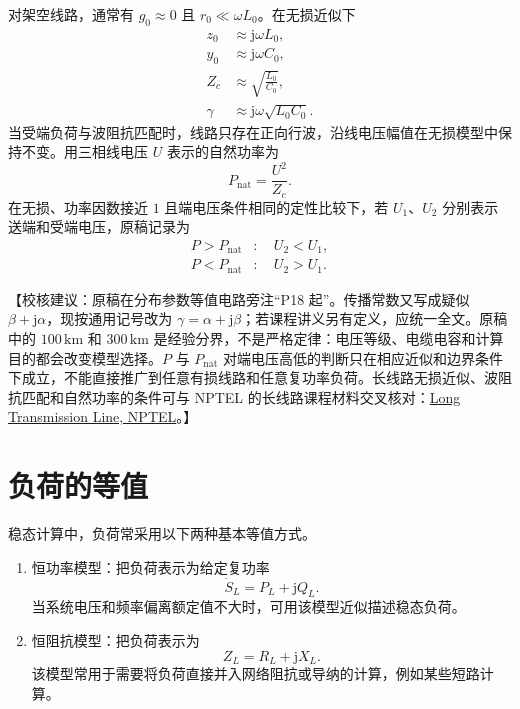\documentclass[
  12pt,
  UTF8,
  a4paper,
  fontset=fandol,
  oneside,
  openany
]{ctexrep}
\newcommand{\reviewnote}[1]{%
  \par\smallskip
  {\color{reviewgray}\small\noindent【校核建议：#1】\par}
  \smallskip
}
\begin{document}
对架空线路，通常有 $g_0\approx0$ 且 $r_0\ll\omega L_0$。在无损近似下
\begin{align}
  z_0    & \approx\mathrm{j}\omega L_0,          \\
  y_0    & \approx\mathrm{j}\omega C_0,          \\
  Z_c    & \approx\sqrt{\frac{L_0}{C_0}},        \\
  \gamma & \approx\mathrm{j}\omega\sqrt{L_0C_0}.
\end{align}
当受端负荷与波阻抗匹配时，线路只存在正向行波，沿线电压幅值在无损模型中保持不变。用三相线电压 $U$ 表示的自然功率为
\begin{equation}
  P_{\mathrm{nat}}=\frac{U^2}{Z_c}.
\end{equation}
在无损、功率因数接近 $1$ 且端电压条件相同的定性比较下，若 $U_1$、$U_2$ 分别表示送端和受端电压，原稿记录为
\begin{align}
  P>P_{\mathrm{nat}} & :\quad U_2<U_1, \\
  P<P_{\mathrm{nat}} & :\quad U_2>U_1.
\end{align}

\reviewnote{原稿在分布参数等值电路旁注“P18 起”。传播常数又写成疑似 $\beta+\mathrm{j}\alpha$，现按通用记号改为 $\gamma=\alpha+\mathrm{j}\beta$；若课程讲义另有定义，应统一全文。原稿中的 $100\,\mathrm{km}$ 和 $300\,\mathrm{km}$ 是经验分界，不是严格定律：电压等级、电缆电容和计算目的都会改变模型选择。$P$ 与 $P_{\mathrm{nat}}$ 对端电压高低的判断只在相应近似和边界条件下成立，不能直接推广到任意有损线路和任意复功率负荷。长线路无损近似、波阻抗匹配和自然功率的条件可与 NPTEL 的长线路课程材料交叉核对：\href{https://archive.nptel.ac.in/content/storage2/courses/108104051/chapter_2/2_8.html}{Long Transmission Line, NPTEL}。}

\section{负荷的等值}

稳态计算中，负荷常采用以下两种基本等值方式。
\begin{enumerate}
  \setlength{\itemsep}{-0.25\baselineskip}
  \setlength{\parsep}{0pt}
  \item 恒功率模型：把负荷表示为给定复功率
        \begin{equation}
          \dot S_L=P_L+\mathrm{j}Q_L.
        \end{equation}
        当系统电压和频率偏离额定值不大时，可用该模型近似描述稳态负荷。
  \item 恒阻抗模型：把负荷表示为
        \begin{equation}
          Z_L=R_L+\mathrm{j}X_L.
        \end{equation}
        该模型常用于需要将负荷直接并入网络阻抗或导纳的计算，例如某些短路计算。
\end{enumerate}
\end{document}
